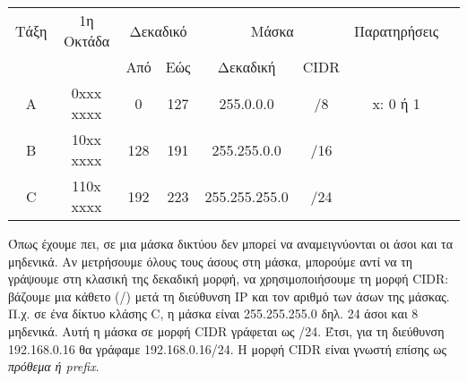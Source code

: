 \begin{center}
\begin{tabular}{|c|c|c|c|c|c|c|c|}
    \rowcolor[gray]{0.95}
    \hline
    \multirow{2}{*}{} Τάξη & 1η Οκτάδα & \multicolumn{2}{|c|}{Δεκαδικό} & \multicolumn{2}{|c|}{Μάσκα} & Παρατηρήσεις \\ 
    \cline{3-6}
     \rowcolor[gray]{0.95}
    & & Από & Εώς & Δεκαδική & CIDR & \\
    \hline
    A & 0xxx xxxx & 0 & 127 & 255.0.0.0 & /8 & x: 0 ή 1\\
    \hline
    Β & 10xx xxxx & 128 & 191 & 255.255.0.0 & /16 & \\
    \hline
    C & 110x xxxx & 192 & 223 & 255.255.255.0 & /24 & \\
    \hline
 \end{tabular}
\end{center}

Όπως έχουμε πει, σε μια μάσκα δικτύου δεν μπορεί να αναμειγνύονται οι άσοι και τα μηδενικά. Αν μετρήσουμε όλους τους άσους στη μάσκα, μπορούμε αντί να τη γράψουμε στη κλασική της δεκαδική μορφή, να χρησιμοποιήσουμε τη μορφή CIDR: βάζουμε μια κάθετο (/) μετά τη διεύθυνση IP και τον αριθμό των άσων της μάσκας. Π.χ. σε ένα δίκτυο κλάσης C, η μάσκα είναι 255.255.255.0 δηλ. 24 άσοι και 8 μηδενικά. Αυτή η μάσκα σε μορφή CIDR γράφεται ως /24. Έτσι, για τη διεύθυνση 192.168.0.16 θα γράφαμε 192.168.0.16/24. Η μορφή CIDR είναι γνωστή επίσης ως \emph{πρόθεμα ή prefix}.